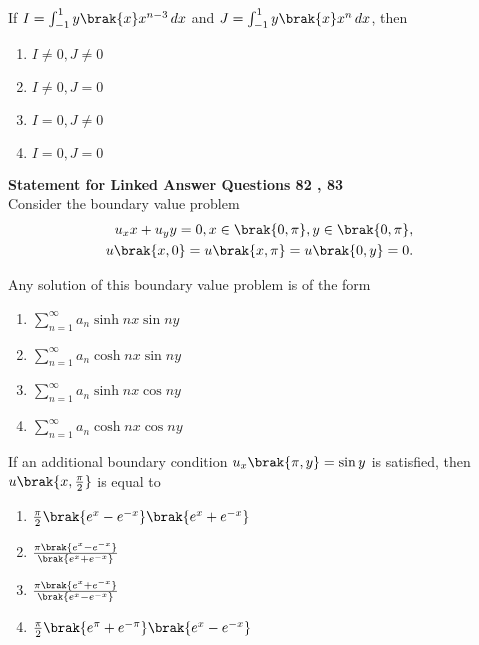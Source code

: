\item[81.] If $I = \int_{-1}^{1} y\brak{x}x^{n-3} \, dx$ and $J = \int_{-1}^{1} y\brak{x}x^{n} \, dx$, then 
		\hfill{}
        \begin{multicols}{4}
		\begin{enumerate}
			\item $I \ne 0, J \ne 0$ 
			\columnbreak
			\item $I \ne 0, J = 0$
			\columnbreak
			\item $I = 0, J \ne 0$
			\columnbreak
        \item $I = 0, J = 0$
		\end{enumerate}
	\end{multicols}

\textbf{Statement for Linked Answer Questions 82 , 83}\\
Consider the boundary value problem
\begin{align}
    u_xx + u_yy = 0, x \in \brak{0, \pi}, y \in \brak{0, \pi}, \\
    u\brak{x, 0} = u\brak{x, \pi} = u\brak{0, y} = 0.
\end{align}
\item[82.] Any solution of this boundary value problem is of the form
		\hfill{}
		\begin{enumerate}
            \item $\sum_{n = 1}^{\infty} a_n \sinh nx \sin ny$ 
            \item $\sum_{n = 1}^{\infty} a_n \cosh nx \sin ny$ 
			\item $\sum_{n = 1}^{\infty} a_n \sinh nx \cos ny$ 
		\item $\sum_{n = 1}^{\infty} a_n \cosh nx \cos ny$ 
		\end{enumerate}
\item[83.] If an additional boundary condition $u_x\brak{\pi, y} = \sin y$ is satisfied, then 
    $u\brak{x, \frac{\pi}{2}}$ is equal to
		\hfill{}
		\begin{enumerate}
            \item $\frac{\pi}{2}\brak{e^x - e^{-x}}\brak{e^x + e^{-x}}$ 
            \item $\frac{\pi\brak{e^x - e^{-x}}}{\brak{e^x + e^{-x}}}$ 
            \item $\frac{\pi\brak{e^x + e^{-x}}}{\brak{e^x - e^{-x}}}$ 
            \item $\frac{\pi}{2}\brak{e^{\pi} + e^{-\pi}}\brak{e^x - e^{-x}}$ 
		\end{enumerate}
